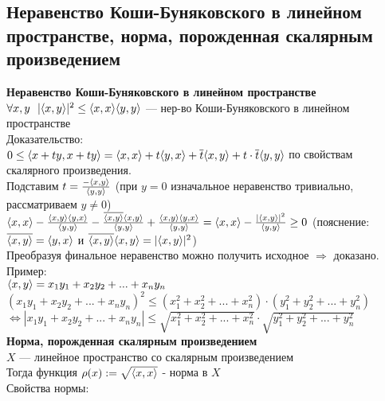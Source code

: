 \subsection{Неравенство Коши-Буняковского в линейном пространстве, норма, порожденная скалярным произведением}
 \textbf{Неравенство Коши-Буняковского в линейном пространстве}\\
$\forall x,y \ \ |\langle x,y \rangle|^2 \leq \langle x,x \rangle\langle y,y \rangle$ --- нер-во Коши-Буняковского в линейном пространстве\\
Доказательство:\\
$0 \leq \langle x+ty,x+ty \rangle = \langle x,x \rangle + t \langle y,x \rangle + \overline{t} \langle x,y \rangle + t \cdot \overline{t}\langle y,y \rangle$ по свойствам скалярного произведения.\\
Подставим $t = \frac{-\langle x,y \rangle}{\langle y,y \rangle}$ (при $y=0$ изначальное неравенство тривиально, рассматриваем $y \neq 0$)\\
$\langle x,x \rangle - \frac{\langle x,y \rangle\langle y,x \rangle}{\langle y,y \rangle} - \frac{\overline{\langle x,y \rangle}\langle x,y \rangle}{\langle y,y \rangle} + \frac{\langle x,y \rangle\langle y,x \rangle}{\langle y,y \rangle} = \langle x,x \rangle - \frac{|\langle x,y \rangle|^2}{\langle y,y \rangle} \geq 0$ (пояснение: $\overline{\langle x,y \rangle} = \langle y,x \rangle$ и $\overline{\langle x,y \rangle}\langle x,y \rangle = |\langle x,y \rangle|^2$)\\
Преобразуя финальное неравенство можно получить исходное $\Rightarrow$ доказано.\\
Пример:\\%
$\langle x,y \rangle = x_1 y_1 + x_2 y_2 + ... + x_n y_n$\\
$(x_1 y_1 + x_2 y_2 + ... + x_n y_n)^2 \leq (x_1^2 + x_2^2 + ... + x_n^2)\cdot(y_1^2 + y_2^2 + ... + y_n^2)$\\
$\Leftrightarrow|x_1 y_1 + x_2 y_2 + ... + x_n y_n| \leq \sqrt{x_1^2 + x_2^2 + ... + x_n^2}\cdot \sqrt{y_1^2 + y_2^2 + ... + y_n^2}$\\
\textbf{Норма, порожденная скалярным произведением}\\
$X$ --- линейное пространство со скалярным произведением\\
Тогда функция $\rho(x) := \sqrt{\langle x,x \rangle}$ - норма в $X$\\
Свойства нормы:
